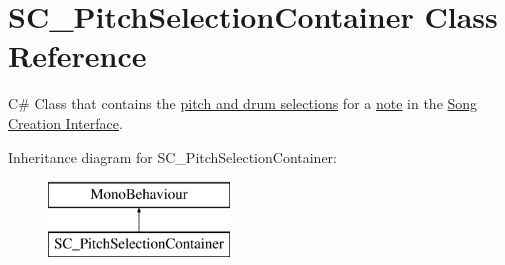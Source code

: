 \hypertarget{class_s_c___pitch_selection_container}{}\section{S\+C\+\_\+\+Pitch\+Selection\+Container Class Reference}
\label{class_s_c___pitch_selection_container}


C\# Class that contains the \hyperlink{group___doc_s_c___p_s_t}{pitch and drum selections} for a \hyperlink{group___music_structs_struct_music_1_1_combined_note}{note} in the \hyperlink{group___doc_s_c}{Song Creation Interface}.  


Inheritance diagram for S\+C\+\_\+\+Pitch\+Selection\+Container\+:\begin{figure}[H]
\begin{center}
\leavevmode
\includegraphics[height=2.000000cm]{class_s_c___pitch_selection_container}
\end{center}
\end{figure}
